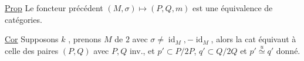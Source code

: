 \uline{Prop} Le foncteur précédent $(M,\sigma)\longmapsto(P,Q,m)$ est une équivalence
de catégories.

\uline{Cor} Supposons $k$ 
, prenons
 $M$  de  $2$
avec $\sigma\ne\operatorname{id}_M,-\operatorname{id}_M$, alors la cat
  
équivaut à celle des paires $(P,Q)$ avec $P,Q$ inv., et
$p'\subset P/2P$, $q'\subset Q/2Q$ et $p'\overset{u}\simeq q'$ donné.

